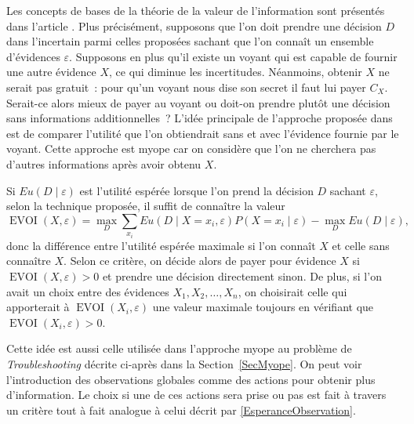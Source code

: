 \documentclass[a4paper,11pt]{article}
\theoremstyle{plain}
\DeclareMathOperator{\EVOI}{EVOI}
\begin{document}
Les concepts de bases de la théorie de la valeur de l'information sont présentés dans l'article \cite{howard_information_1966}. Plus précisément, supposons que l'on doit prendre une décision $D$ dans l'incertain parmi celles proposées sachant que l'on connaît un ensemble d'évidences $\varepsilon$. Supposons en plus qu'il existe un voyant qui est capable de fournir une autre évidence $X$, ce qui diminue les incertitudes. Néanmoins, obtenir $X$ ne serait pas gratuit~: pour qu'un voyant nous dise son secret il faut lui payer $C_X$. Serait-ce alors mieux de payer au voyant ou doit-on prendre plutôt une décision sans informations additionnelles~? L'idée principale de l'approche proposée dans \cite{howard_information_1966} est de comparer l'utilité que l'on obtiendrait sans et avec l'évidence fournie par le voyant. Cette approche est myope car on considère que l'on ne cherchera pas d'autres informations après avoir obtenu $X$.

Si $E u(D \mid \varepsilon)$ est l'utilité espérée lorsque l'on prend la décision $D$ sachant $\varepsilon$, selon la technique proposée, il suffit de connaître la valeur
\begin{equation}
\label{EsperanceObservation}
\EVOI(X, \varepsilon) = \max_{D} \sum_{x_i} Eu(D \mid X = x_i, \varepsilon) P(X = x_i \mid \varepsilon) - \max_{D} Eu(D \mid \varepsilon),
\end{equation}
donc la différence entre l'utilité espérée maximale si l'on connaît $X$ et celle sans connaître $X$. Selon ce critère, on décide alors de payer pour évidence $X$ si $\EVOI(X, \varepsilon) > 0$ et prendre une décision directement sinon. De plus, si l'on avait un choix entre des évidences $X_1, X_2, \dotsc, X_n$, on choisirait celle qui apporterait à $\EVOI(X_i, \varepsilon)$ une valeur maximale toujours en vérifiant que $\EVOI(X_i, \varepsilon) > 0$.

Cette idée est aussi celle utilisée dans l'approche myope au problème de \emph{Troubleshooting} décrite ci-après dans la Section~\ref{SecMyope}. On peut voir l'introduction des observations globales comme des actions pour obtenir plus d'information. Le choix si une de ces actions sera prise ou pas est fait à travers un critère tout à fait analogue à celui décrit par \eqref{EsperanceObservation}.

\end{document}
